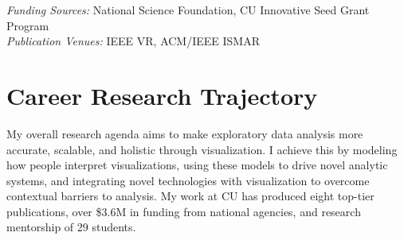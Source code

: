 \documentclass[11pt]{article}
\begin{document}


\emph{Funding Sources:} National Science Foundation, CU Innovative Seed Grant Program\\
\emph{Publication Venues:} IEEE VR, ACM/IEEE ISMAR

\section*{Career Research Trajectory}

My overall research agenda aims to 
make exploratory data analysis more accurate, scalable, and holistic through visualization. I achieve this by modeling how people interpret visualizations, using these models to drive novel analytic systems, and integrating novel technologies with visualization to overcome contextual barriers to analysis. My work at CU has produced eight top-tier publications, over \$3.6M in funding from national agencies, and research mentorship of 29 students. 
\end{document}
